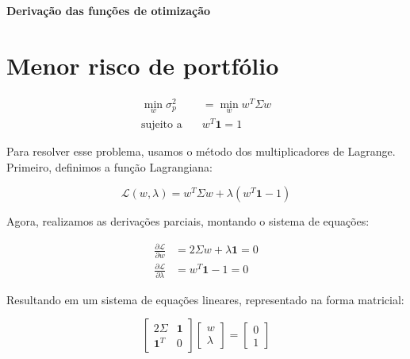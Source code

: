\documentclass[a4paper,10pt]{article}
\begin{document}
\begin{center}
    {\Large \textbf{Derivação das funções de otimização}}
\end{center}

\section*{Menor risco de portfólio}

\begin{equation*}
    \begin{aligned}
        \min_{w} \sigma_{p}^{2} &= \min_{w} w^{T} \Sigma w \\
        \text{sujeito a} \quad & w^{T} \mathbf{1} = 1
    \end{aligned}
\end{equation*}

Para resolver esse problema, usamos o método dos multiplicadores de Lagrange. Primeiro, definimos a função Lagrangiana:

\begin{equation*}
    \mathcal{L}(w, \lambda) = w^{T} \Sigma w + \lambda (w^{T} \mathbf{1} - 1)
\end{equation*}

Agora, realizamos as derivações parciais, montando o sistema de equações:

\begin{equation*}
    \begin{aligned}
        \frac{\partial \mathcal{L}}{\partial w} &= 2 \Sigma w + \lambda \mathbf{1} = 0 \\
        \frac{\partial \mathcal{L}}{\partial \lambda} &= w^{T} \mathbf{1} - 1 = 0
    \end{aligned}
\end{equation*}

Resultando em um sistema de equações lineares, representado na forma matricial:

\begin{equation*}
    \begin{bmatrix}
        2 \Sigma & \mathbf{1} \\
        \mathbf{1}^{T} & 0
    \end{bmatrix}
    \begin{bmatrix}
        w \\
        \lambda
    \end{bmatrix}
    =
    \begin{bmatrix}
        0 \\
        1
    \end{bmatrix}
\end{equation*}
\end{document}

